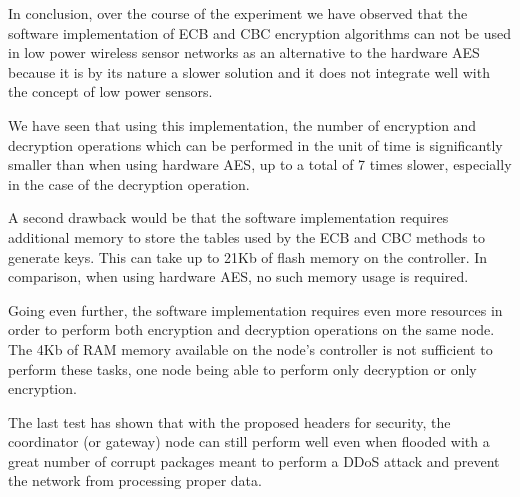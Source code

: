 In conclusion, over the course of the experiment we have observed that the 
software implementation of ECB and CBC encryption algorithms can not be used in low 
power wireless sensor networks as an alternative to the hardware AES because it 
is by its nature a slower solution and it does not integrate well with the 
concept of low power sensors.

We have seen that using this implementation, the number of encryption 
and decryption operations which can be performed in the unit of time 
is significantly smaller than when using hardware AES, up to a total 
of 7 times slower, especially in the case of the decryption operation.

A second drawback would be that the software implementation requires 
additional memory to store the tables used by the ECB and CBC methods 
to generate keys. This can take up to 21Kb of flash memory on the controller.
In comparison, when using hardware AES, no such memory usage is required.

Going even further, the software implementation requires even more resources 
in order to perform both encryption and decryption operations on the same node. The 4Kb of 
RAM memory available on the node's controller is not sufficient to perform these tasks, one node
being able to perform only decryption or only encryption.

The last test has shown that with the proposed headers for security, the coordinator (or 
gateway) node can still perform well even when flooded with a great number of corrupt 
packages meant to perform a DDoS attack and prevent the network from processing 
proper data.
